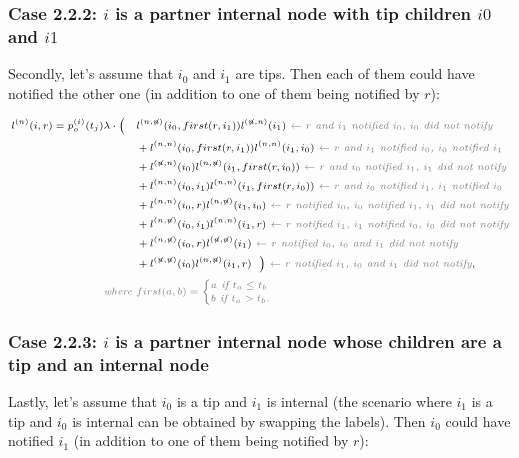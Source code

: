 \documentclass[a4paper,10pt]{article}
\begin{document}
\subsubsection*{Case 2.2.2: $i$ is a partner internal node with tip children $i0$ and $i1$} 
Secondly, let's assume that $i_0$ and $i_1$ are tips. Then each of them could have notified the other one (in addition to one of them being notified by $r$):

 
\begin{equation}
\scriptsize
\begin{split}
l^{(n)}(i, r) = p_o^{(i)}(t_j) \lambda \cdot
\Big(~~~&l^{(n,\not{n})}(i_0,first(r,i_1))l^{(\not{n},n)}(i_1) \textit{\color{gray}~$\leftarrow$ $r$ and $i_1$ notified $i_0$, $i_0$ did not notify} \\
&+ l^{(n,n)}(i_0,first(r,i_1))l^{(n,n)}(i_1, i_0) \textit{\color{gray}~$\leftarrow$ $r$ and $i_1$ notified $i_0$, $i_0$ notified $i_1$} \\
&+l^{(\not{n},n)}(i_0)l^{(n,\not{n})}(i_1,first(r,i_0)) \textit{\color{gray}~$\leftarrow$ $r$ and $i_0$ notified $i_1$, $i_1$ did not notify} \\
&+ l^{(n,n)}(i_0, i_1)l^{(n,n)}(i_1,first(r,i_0)) \textit{\color{gray}~$\leftarrow$ $r$ and $i_0$ notified $i_1$, $i_1$ notified $i_0$} \\
&+l^{(n,n)}(i_0,r)l^{(n,\not{n})}(i_1, i_0) \textit{\color{gray}~$\leftarrow$ $r$ notified $i_0$, $i_0$ notified $i_1$, $i_1$ did not notify} \\
& + l^{(n,\not{n})}(i_0, i_1)l^{(n,n)}(i_1,r) \textit{\color{gray}~$\leftarrow$ $r$ notified $i_1$, $i_1$ notified $i_0$, $i_0$ did not notify} \\
&+l^{(n,\not{n})}(i_0,r)l^{(\not{n},\not{n})}(i_1) \textit{\color{gray}~$\leftarrow$ $r$ notified $i_0$, $i_0$ and $i_1$ did not notify} \\
& + l^{(\not{n},\not{n})}(i_0)l^{(n,\not{n})}(i_1,r)~~\Big) \textit{\color{gray}~$\leftarrow$ $r$ notified $i_1$, $i_0$ and $i_1$ did not notify}, \\
\textit{\color{gray}~where } &\color{gray}first(a,b) = 
\begin{cases}
a \textit{~if $t_a \leq t_b$}\\
b \textit{~if $t_a > t_b$.}
\end{cases} 
 \end{split}
\label{eq:lu-tip-tip}
\end{equation}


\subsubsection*{Case 2.2.3: $i$ is a partner internal node whose children are a tip and an internal node}
Lastly, let's assume that $i_0$ is a tip and $i_1$ is internal (the scenario where $i_1$ is a tip and $i_0$ is internal can be obtained by swapping the labels). Then $i_0$ could have notified $i_1$ (in addition to one of them being notified by $r$):
\end{document}
